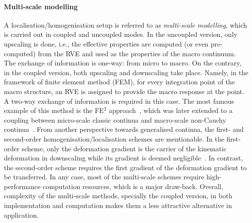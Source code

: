 	\paragraph{Multi-scale modelling} A localisation/homogenisation setup is referred to as \textit{multi-scale modelling}, which is carried out in coupled and uncoupled modes. In the uncoupled version, only upscaling is done, i.e., the effective properties are computed (or even pre-computed) from the RVE and used as the properties of the macro continuum. The exchange of information is one-way: from micro to macro. On the contrary, in the coupled version, both upscaling and downscaling take place. Namely, in the framework of finite element method (FEM), for every integration point of the macro structure, an RVE is assigned to provide the macro response at the point. A two-way exchange of information is required in this case. The most famous example of this method is the FE$^2$ approach~\autocite{Feyel.1999}, which was later extended to a coupling between micro-scale classic continua and macro-scale non-Cauchy continua~\autocite{Feyel.2003}. From another perspective towards generalised continua, the first- and second-order homogenisation/localisation schemes are mentionable. In the first-order scheme, only the deformation gradient is the carrier of the kinematic deformation in downscaling while its gradient is deemed negligible~\autocite{Kouznetsova.2002}. In contrast, the second-order scheme requires the first gradient of the deformation gradient to be transferred. In any case, most of the multi-scale schemes require high-performance computation resources, which is a major draw-back. Overall, complexity of the multi-scale methods, specially the coupled version, in both implementation and computation makes them a less attractive alternative in application.
		
